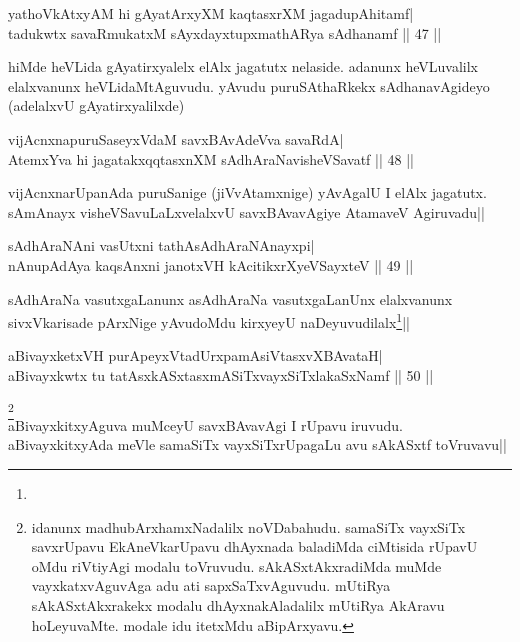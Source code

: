 
\begin{shl}
yathoVkAtxyAM hi gAyatArxyXM kaqtasxrXM jagadupAhitamf| \\
tadukwtx savaRmukatxM sAyxdayxtupxmathARya sAdhanamf \hfill ||  47 || 
\end{shl}

\begin{artha} 
hiMde heVLida gAyatirxyalelx elAlx jagatutx nelaside. adanunx 
heVLuvalilx elalxvanunx heVLidaMtAguvudu. yAvudu puruSAthaRkekx 
sAdhanavAgideyo (adelalxvU gAyatirxyalilxde)
\end{artha}


\begin{shl}
vijAcnxnapuruSaseyxVdaM savxBAvAdeVva savaRdA| \\
AtemxYva hi jagatakxqqtasxnXM sAdhAraNavisheVSavatf \hfill ||  48 ||
\end{shl}

\begin{artha} 
vijAcnxnarUpanAda puruSanige (jiVvAtamxnige) yAvAgalU I elAlx 
jagatutx. sAmAnayx visheVSavuLaLxvelalxvU savxBAvavAgiye AtamaveV 
Agiruvadu||
\end{artha}


\begin{shl}
sAdhAraNAni vasUtxni tathA\s sAdhAraNAnayxpi| \\
nAnupAdAya kaqsAnxni janotxVH kAcitikxrXyeVSayxteV \hfill ||  49 || 
\end{shl}

\begin{artha} 
sAdhAraNa vasutxgaLanunx asAdhAraNa vasutxgaLanUnx elalxvanunx 
sivxVkarisade pArxNige yAvudoMdu kirxyeyU naDeyuvudilalx\footnote[1]{}||
\end{artha}


\begin{shl}
aBivayxketxVH purA\s peyxVtadUrxpamAsiVtasxvXBAvataH| \\
aBivayxkwtx tu tatAsxkASxtasxmASiTxvayxSiTxlakaSxNamf \hfill ||  50 || 
\end{shl}

\begin{artha} 
\footnote[2]{idanunx madhubArxhamxNadalilx noVDabahudu. samaSiTx 
vayxSiTx savxrUpavu EkAneVkarUpavu dhAyxnada baladiMda ciMtisida 
rUpavU oMdu riVtiyAgi modalu toVruvudu. sAkASxtAkxradiMda muMde 
vayxkatxvAguvAga adu ati sapxSaTxvAguvudu. mUtiRya sAkASxtAkxrakekx 
modalu dhAyxnakAladalilx mUtiRya AkAravu hoLeyuvaMte. modale idu 
itetxMdu aBipArxyavu.}\\
aBivayxkitxyAguva muMceyU savxBAvavAgi I rUpavu iruvudu. 
aBivayxkitxyAda meVle samaSiTx vayxSiTxrUpagaLu avu sAkASxtf 
toVruvavu||
\end{artha}

